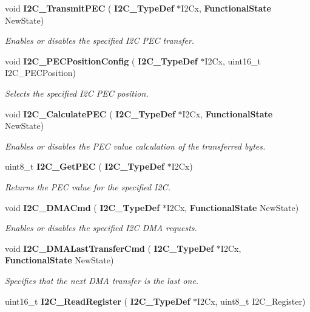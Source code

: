 \begin{DoxyCompactItemize}
void \textbf{ I2\+C\+\_\+\+Transmit\+P\+EC} (\textbf{ I2\+C\+\_\+\+Type\+Def} $\ast$I2\+Cx, \textbf{ Functional\+State} New\+State)
\begin{DoxyCompactList}\small\item\em Enables or disables the specified I2C P\+EC transfer. \end{DoxyCompactList}\item 
void \textbf{ I2\+C\+\_\+\+P\+E\+C\+Position\+Config} (\textbf{ I2\+C\+\_\+\+Type\+Def} $\ast$I2\+Cx, uint16\+\_\+t I2\+C\+\_\+\+P\+E\+C\+Position)
\begin{DoxyCompactList}\small\item\em Selects the specified I2C P\+EC position. \end{DoxyCompactList}\item 
void \textbf{ I2\+C\+\_\+\+Calculate\+P\+EC} (\textbf{ I2\+C\+\_\+\+Type\+Def} $\ast$I2\+Cx, \textbf{ Functional\+State} New\+State)
\begin{DoxyCompactList}\small\item\em Enables or disables the P\+EC value calculation of the transferred bytes. \end{DoxyCompactList}\item 
uint8\+\_\+t \textbf{ I2\+C\+\_\+\+Get\+P\+EC} (\textbf{ I2\+C\+\_\+\+Type\+Def} $\ast$I2\+Cx)
\begin{DoxyCompactList}\small\item\em Returns the P\+EC value for the specified I2C. \end{DoxyCompactList}\item 
void \textbf{ I2\+C\+\_\+\+D\+M\+A\+Cmd} (\textbf{ I2\+C\+\_\+\+Type\+Def} $\ast$I2\+Cx, \textbf{ Functional\+State} New\+State)
\begin{DoxyCompactList}\small\item\em Enables or disables the specified I2C D\+MA requests. \end{DoxyCompactList}\item 
void \textbf{ I2\+C\+\_\+\+D\+M\+A\+Last\+Transfer\+Cmd} (\textbf{ I2\+C\+\_\+\+Type\+Def} $\ast$I2\+Cx, \textbf{ Functional\+State} New\+State)
\begin{DoxyCompactList}\small\item\em Specifies that the next D\+MA transfer is the last one. \end{DoxyCompactList}\item 
uint16\+\_\+t \textbf{ I2\+C\+\_\+\+Read\+Register} (\textbf{ I2\+C\+\_\+\+Type\+Def} $\ast$I2\+Cx, uint8\+\_\+t I2\+C\+\_\+\+Register)

\end{DoxyCompactItemize}
